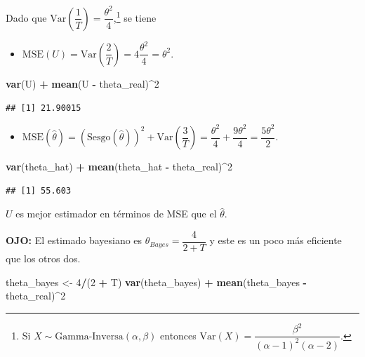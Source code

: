 \documentclass[
  12pt,
]{book}
\newenvironment{Shaded}{\begin{snugshade}}{\end{snugshade}}
\newcommand{\DecValTok}[1]{\textcolor[rgb]{0.00,0.00,0.81}{#1}}
\newcommand{\KeywordTok}[1]{\textcolor[rgb]{0.13,0.29,0.53}{\textbf{#1}}}
\newcommand{\NormalTok}[1]{#1}
\newcommand{\OperatorTok}[1]{\textcolor[rgb]{0.81,0.36,0.00}{\textbf{#1}}}
\newcommand{\StringTok}[1]{\textcolor[rgb]{0.31,0.60,0.02}{#1}}
\providecommand{\tightlist}{%
  \setlength{\itemsep}{0pt}\setlength{\parskip}{0pt}}
\begin{document}
Dado que \(\text{Var}\left(\dfrac 1T\right) = \dfrac{\theta^2}4\),\footnote{Si \(X\sim\text{Gamma-Inversa}(\alpha, \beta)\) entonces \(\text{Var}(X)=\dfrac{\beta ^{2}}{(\alpha -1)^2(\alpha-2)}\).} se tiene

\begin{itemize}
\tightlist
\item
  \(\mathrm{MSE}(U) = \text{Var}\left(\dfrac 2T\right) = 4\dfrac{\theta^2}4 = \theta^2\).
\end{itemize}

\begin{Shaded}
\begin{Highlighting}[]
\KeywordTok{var}\NormalTok{(U) }\OperatorTok{+}\StringTok{ }\KeywordTok{mean}\NormalTok{(U }\OperatorTok{{-}}\StringTok{ }\NormalTok{theta\_real)}\OperatorTok{\^{}}\DecValTok{2}
\end{Highlighting}
\end{Shaded}

\begin{verbatim}
## [1] 21.90015
\end{verbatim}

\begin{itemize}
\tightlist
\item
  \(\mathrm{MSE}(\hat\theta) = (\text{Sesgo}(\hat\theta))^2+\text{Var}\left(\dfrac 3T\right) = \dfrac{\theta^2}{4}+\dfrac{9\theta^2}{4} = \dfrac{5\theta^2}{2}\).
\end{itemize}

\begin{Shaded}
\begin{Highlighting}[]
\KeywordTok{var}\NormalTok{(theta\_hat) }\OperatorTok{+}\StringTok{ }\KeywordTok{mean}\NormalTok{(theta\_hat }\OperatorTok{{-}}\StringTok{ }\NormalTok{theta\_real)}\OperatorTok{\^{}}\DecValTok{2}
\end{Highlighting}
\end{Shaded}

\begin{verbatim}
## [1] 55.603
\end{verbatim}

\(U\) es mejor estimador en términos de MSE que el \(\hat\theta\).

\textbf{OJO:} El estimado bayesiano es \(\theta_{Bayes} = \dfrac{4}{2+T}\) y este es
un poco más eficiente que los otros dos.

\begin{Shaded}
\begin{Highlighting}[]
\NormalTok{theta\_bayes \textless{}{-}}\StringTok{ }\DecValTok{4}\OperatorTok{/}\NormalTok{(}\DecValTok{2} \OperatorTok{+}\StringTok{ }\NormalTok{T)}
\KeywordTok{var}\NormalTok{(theta\_bayes) }\OperatorTok{+}\StringTok{ }\KeywordTok{mean}\NormalTok{(theta\_bayes }\OperatorTok{{-}}\StringTok{ }\NormalTok{theta\_real)}\OperatorTok{\^{}}\DecValTok{2}
\end{Highlighting}
\end{Shaded}
\end{document}
